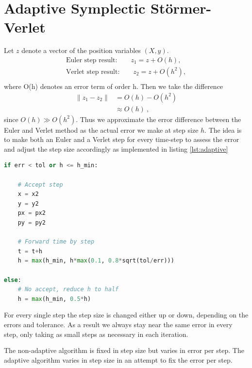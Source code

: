 \section{Adaptive Symplectic Störmer-Verlet}
Let $z$ denote a vector of the position variables $(X,y)$.
\begin{align}
\text{Euler step result:} \qquad z_1 = z + O(h), \\
\text{Verlet step result:} \qquad z_2 = z + O(h^2), \\
\end{align}
where O(h) denotes an error term of order h. Then we take the difference
\begin{align}
\|z_1 - z_2\| &= O(h) - O(h^2) \\
&\approx O(h)\ ,
\end{align}
since $O(h) \gg O(h^2)$. Thus we approximate the error difference between the Euler and Verlet method as the actual error we make at step size $h$. The idea is to make both an Euler and a Verlet step for every time-step to assess the error and adjust the step size accordingly as implemented in listing \ref{lst:adaptive}
\begin{adjustwidth*}{0cm}{-0.4cm}
\begin{lstlisting}[language=Python,caption=Adaptive method implemented in python. We accept the Verlet step only if the error is no more than a given tolerance \texttt{tol}. Subsequently we estimate a new \texttt{h} that will yield an error of \texttt{tol} in the next step and use \texttt{0.8} of this value to avoid frequent rejects. If the step is rejected we reduce the step size by half,label=lst:adaptive]
if err < tol or h <= h_min:

    # Accept step
    x = x2
    y = y2
    px = px2
    py = py2

    # Forward time by step
    t = t+h
    h = max(h_min, h*max(0.1, 0.8*sqrt(tol/err)))

else:
    # No accept, reduce h to half
    h = max(h_min, 0.5*h)
\end{lstlisting}
\end{adjustwidth*}
For every single step the step size is changed either up or down, depending on the errors and tolerance. As a result we always stay near the same error in every step, only taking as small steps as necessary in each iteration.

The non-adaptive algorithm is fixed in step size but varies in error per step.
The adaptive algorithm varies in step size in an attempt to fix the error per step.

